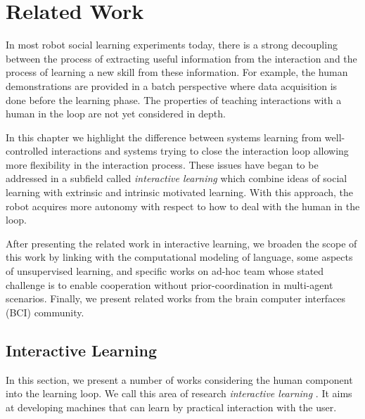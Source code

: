 
\chapter{Related Work}
\label{chapter:relatedwork}
\minitoc

In most robot social learning experiments today, there is a strong decoupling between the process of extracting useful information from the interaction and the process of learning a new skill from these information. For example, the human demonstrations are provided in a batch perspective where data acquisition is done before the learning phase. The properties of teaching interactions with a human in the loop are not yet considered in depth.

In this chapter we highlight the difference between systems learning from well-controlled interactions and systems trying to close the interaction loop allowing more flexibility in the interaction process. These issues have began to be addressed in a subfield called \emph{interactive learning}  which combine ideas of social learning with extrinsic and intrinsic motivated learning. With this approach, the robot acquires more autonomy with respect to how to deal with the human in the loop. 

After presenting the related work in interactive learning, we broaden the scope of this work by linking with the computational modeling of language, some aspects of unsupervised learning, and specific works on ad-hoc team whose stated challenge is to enable cooperation without prior-coordination in multi-agent scenarios. Finally, we present related works from the brain computer interfaces (BCI) community.

\section{Interactive Learning}

In this section, we present a number of works considering the human component into the learning loop. We call this area of research \emph{interactive learning} \cite{nicolescu2003natural,breazeal2004tutelage}. It aims at developing machines that can learn by practical interaction with the user.


